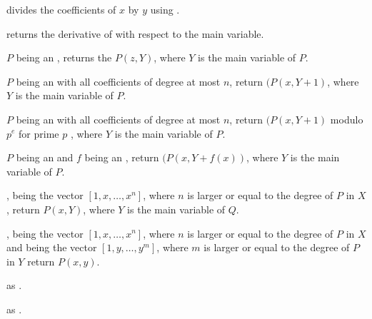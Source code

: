 
 divides the coefficients of $x$
by $y$ using .

 returns the derivative of  with
respect to the main variable.



 $P$ being an , returns
the  $P(z,Y)$, where $Y$ is the main variable of $P$.


 $P$ being an  with
all coefficients of degree at most $n$, return $(P(x,Y+1)$, where $Y$ is the
main variable of $P$.

$P$ being an  with all coefficients of degree at most $n$, return
$(P(x,Y+1)$  modulo $p^e$ for prime $p$ , where $Y$ is the main variable of
$P$.

 $P$ being an 
and $f$ being an , return $(P(x,Y+f(x))$, where $Y$ is the main
variable of $P$.

, 
being the vector $[1,x,\dots,x^n]$, where $n$ is larger or equal to the degree
of $P$ in $X$, return $P(x,Y)$, where $Y$ is the main variable of $Q$.

,
 being the vector $[1,x,\dots,x^n]$, where $n$ is larger or equal to
the degree of $P$ in $X$ and  being the vector $[1,y,\dots,y^m]$,
where $m$ is larger or equal to the degree of $P$ in $Y$ return $P(x,y)$.

 as
.


 as
.


